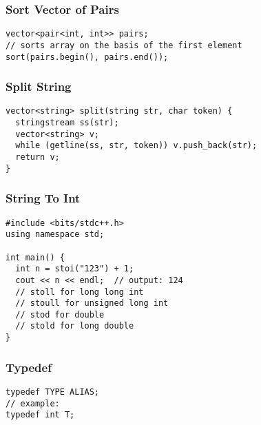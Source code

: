 \documentclass[twoside]{article}
\begin{document}
\begin{multicols*}{2}
\subsubsectionfont{\large\bfseries\sffamily\underline}
\subsubsection*{Sort Vector of Pairs}
\begin{verbatim}
vector<pair<int, int>> pairs;
// sorts array on the basis of the first element
sort(pairs.begin(), pairs.end());

\end{verbatim}

\subsubsectionfont{\large\bfseries\sffamily\underline}
\subsubsection*{Split String}
\begin{verbatim}
vector<string> split(string str, char token) {
  stringstream ss(str);
  vector<string> v;
  while (getline(ss, str, token)) v.push_back(str);
  return v;
}
\end{verbatim}

\subsubsectionfont{\large\bfseries\sffamily\underline}
\subsubsection*{String To Int}
\begin{verbatim}
#include <bits/stdc++.h>
using namespace std;

int main() {
  int n = stoi("123") + 1;
  cout << n << endl;  // output: 124
  // stoll for long long int
  // stoull for unsigned long int
  // stod for double
  // stold for long double
}
\end{verbatim}

\subsubsectionfont{\large\bfseries\sffamily\underline}
\subsubsection*{Typedef}
\begin{verbatim}
typedef TYPE ALIAS;
// example:
typedef int T;
\end{verbatim}

\subsubsectionfont{\large\bfseries\sffamily\underline}

\end{multicols*}
\end{document}

